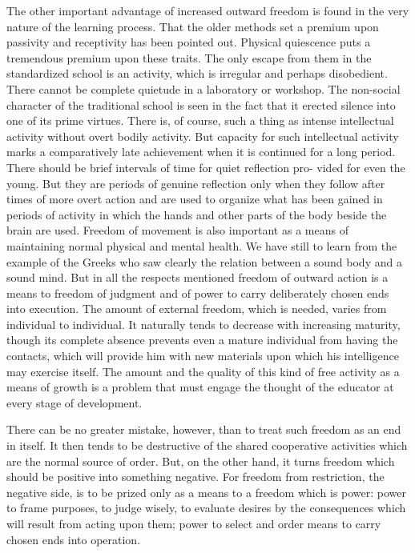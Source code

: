 The other important advantage of increased outward freedom is found in the very 
nature of the learning process. That the older methods set a premium upon passivity and 
receptivity has been pointed out. Physical quiescence puts a tremendous premium upon 
these traits. The only escape from them in the standardized school is an activity, which is 
irregular and perhaps disobedient. There cannot be complete quietude in a laboratory or 
workshop. The non-social character of the traditional school is seen in the fact that it 
erected silence into one of its prime virtues. There is, of course, such a thing as intense 
intellectual activity without overt bodily activity. But capacity for such intellectual 
activity marks a comparatively late achievement when it is continued for a long period. 
There should be brief intervals of time for quiet reflection pro- vided for even the young. 
But they are periods of genuine reflection only when they follow after times of more 
overt action and are used to organize what has been gained in periods of activity in which 
the hands and other parts of the body beside the brain are used. Freedom of movement is 
also important as a means of maintaining normal physical and mental health. We have 
still to learn from the example of the Greeks who saw clearly the relation between a 
sound body and a sound mind. But in all the respects mentioned freedom of outward 
action is a means to freedom of judgment and of power to carry deliberately chosen ends 
into execution. The amount of external freedom, which is needed, varies from individual 
to individual. It naturally tends to decrease with increasing maturity, though its complete 
absence prevents even a mature individual from having the contacts, which will provide 
him with new materials upon which his intelligence may exercise itself. The amount and 
the quality of this kind of free activity as a means of growth is a problem that must 
engage the thought of the educator at every stage of development. 

There can be no greater mistake, however, than to treat such freedom as an end in 
itself. It then tends to be destructive of the shared cooperative activities which are the 
normal source of order. But, on the other hand, it turns freedom which should be positive 
into something negative. For freedom from restriction, the negative side, is to be prized 
only as a means to a freedom which is power: power to frame purposes, to judge wisely, 
to evaluate desires by the consequences which will result from acting upon them; power 
to select and order means to carry chosen ends into operation. 

